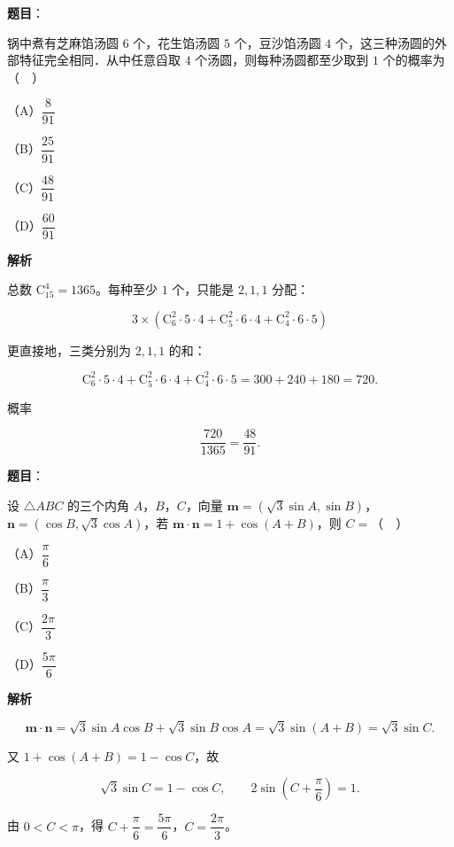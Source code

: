 \begin{answer}

\textbf{题目}：

锅中煮有芝麻馅汤圆 $6$ 个，花生馅汤圆 $5$ 个，豆沙馅汤圆 $4$ 个，这三种汤圆的外部特征完全相同．从中任意舀取 $4$ 个汤圆，则每种汤圆都至少取到 $1$ 个的概率为（　）

（A）$\dfrac8{91}$

（B）$\dfrac{25}{91}$

（C）$\dfrac{48}{91}$

（D）$\dfrac{60}{91}$

\textbf{解析}

总数 $\mathrm C_{15}^4=1365$。每种至少 $1$ 个，只能是 $2,1,1$ 分配：

\nopagebreak[4]
\[3\times\left(\mathrm C_6^2\cdot5\cdot4+\mathrm C_5^2\cdot6\cdot4+\mathrm C_4^2\cdot6\cdot5\right)\]

更直接地，三类分别为 $2,1,1$ 的和：

\nopagebreak[4]
\[\mathrm C_6^2\cdot5\cdot4+\mathrm C_5^2\cdot6\cdot4+\mathrm C_4^2\cdot6\cdot5
=300+240+180=720.\]

概率

\nopagebreak[4]
\[\frac{720}{1365}=\frac{48}{91}.\]


\end{answer}
\begin{answer}

\textbf{题目}：

设 $\triangle ABC$ 的三个内角 $A$，$B$，$C$，向量 $\boldsymbol m=(\sqrt3\sin A,\sin B)$，$\boldsymbol n=(\cos B,\sqrt3\cos A)$，若 $\boldsymbol m\cdot\boldsymbol n=1+\cos(A+B)$，则 $C=$（　）

（A）$\dfrac\pi6$

（B）$\dfrac\pi3$

（C）$\dfrac{2\pi}3$

（D）$\dfrac{5\pi}6$

\textbf{解析}

\nopagebreak[4]
\[\boldsymbol m\cdot\boldsymbol n
=\sqrt3\sin A\cos B+\sqrt3\sin B\cos A
=\sqrt3\sin(A+B)=\sqrt3\sin C.\]

又 $1+\cos(A+B)=1-\cos C$，故

\nopagebreak[4]
\[\sqrt3\sin C=1-\cos C,\qquad 2\sin\left(C+\frac\pi6\right)=1.\]

由 $0<C<\pi$，得 $C+\dfrac\pi6=\dfrac{5\pi}6$，$C=\dfrac{2\pi}3$。


\end{answer}
